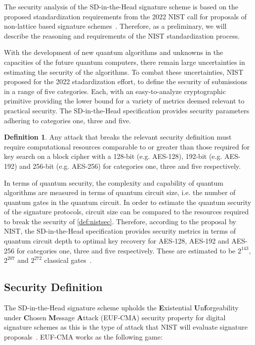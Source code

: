 \documentclass[twoside,11pt]{report}
\theoremstyle{definition}
\newtheorem{definition}{Definition}[section]
\theoremstyle{plain}
\begin{document}
The security analysis of the SD-in-the-Head signature scheme is based on the proposed standardization requirements from the 2022 NIST call for proposals of non-lattice based signature schemes~\cite{nistcall}. Therefore, as a preliminary, we will describe the reasoning and requirements of the NIST standardization process.

With the development of new quantum algorithms and unknowns in the capacities of the future quantum computers, there remain large uncertainties in estimating the security of the algorithms. To combat these uncertainties, NIST proposed for the 2022 stadardization effort, to define the security of submissions in a range of five categories. Each, with an easy-to-analyze cryptographic primitive providing the lower bound for a variety of metrics deemed relevant to practical security. The SD-in-the-Head specification provides security parameters adhering to categories one, three and five.

\begin{definition}\label{def:nistsec}
  Any attack that breaks the relevant security definition must require computational resources comparable to or greater than those required for key search on a block cipher with a 128-bit (e.g. AES-128), 192-bit (e.g. AES-192) and 256-bit (e.g. AES-256) for categories one, three and five respectively.
\end{definition}

In terms of quantum security, the complexity and capability of quantum algorithms are measured in terms of quantum circuit size, i.e. the number of quantum gates in the quantum circuit. In order to estimate the quantum security of the signature protocols, circuit size can be compared to the resources required to break the security of \autoref{def:nistsec}. Therefore,
according to the proposal by NIST, the SD-in-the-Head specification provides security metrics in terms of quantum circuit depth to optimal key recovery for AES-128, AES-192 and AES-256 for categories one, three and five respectively. These are estimated to be $2^{143}$, $2^{207}$ and $2^{272}$ classical gates~\cite{nistcall}.

\subsection{Security Definition}

The SD-in-the-Head signature scheme upholds the \textbf{E}xistential \textbf{U}n\textbf{f}orgeability under \textbf{C}hosen \textbf{M}essage \textbf{A}ttack (EUF-CMA) security property for digital signature schemes as this is the type of attack that NIST will evaluate signature proposals~\cite{nistcall,aguilarsyndrome11}. EUF-CMA works as the following game:
\end{document}
